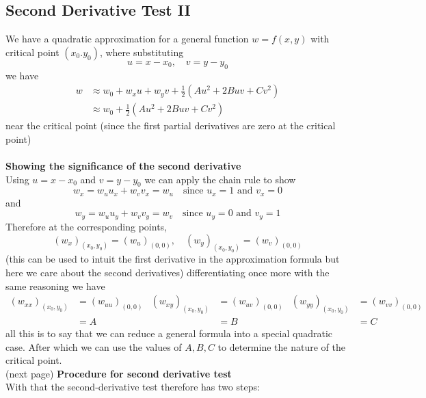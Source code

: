 \documentclass{report}
\begin{document}
\subsection{Second Derivative Test II}
We have a quadratic approximation for a general function 
$w=f(x,y)$ with critical point $(x_0.y_0)$, where substituting
\begin{equation*}
u=x-x_0,\quad v=y-y_0
\end{equation*}
we have
\begin{align*}
w&\approx w_0+w_xu+w_yv+\frac{1}{2}(Au^2+2Buv+Cv^2)\\
&\approx w_0+\frac{1}{2}(Au^2+2Buv+Cv^2)
\end{align*}
near the critical point (since the first partial derivatives are zero at the critical point)\\
\vspace{1mm}\\
\textbf{Showing the significance of the second derivative}\\
Using $u=x-x_0$ and $v=y-y_0$ we can apply the chain rule to show
\begin{equation*}
w_x=w_uu_x+w_vv_x=w_u\quad\text{since }u_x=1\text{ and }v_x=0
\end{equation*}
and
\begin{equation*}
w_y=w_uu_y+w_vv_y=w_v\quad\text{since }u_y=0\text{ and }v_y=1
\end{equation*}
Therefore at the corresponding points,
\begin{equation*}
(w_x)_{(x_0,y_0)}=(w_u)_{(0,0)},\quad
(w_y)_{(x_0,y_0)}=(w_v)_{(0,0)}
\end{equation*}
(this can be used to intuit the first derivative in the approximation formula but here we care about the 
second derivatives) differentiating once more with the same reasoning we have
\begin{align*}
(w_{xx})_{(x_0,y_0)}&=(w_{uu})_{(0,0)}
&(w_{xy})_{(x_0,y_0)}&=(w_{uv})_{(0,0)}
&(w_{yy})_{(x_0,y_0)}&=(w_{vv})_{(0,0)}\\
&=A&&=B&&=C
\end{align*}
all this is to say that we can reduce a general formula into a special quadratic case.
After which we can use the values of $A,B,C$ to determine the nature of the critical point.\\
(next page)
\newpage
\noindent\textbf{Procedure for second derivative test}\\
With that the second-derivative test therefore has two steps:
\end{document}
